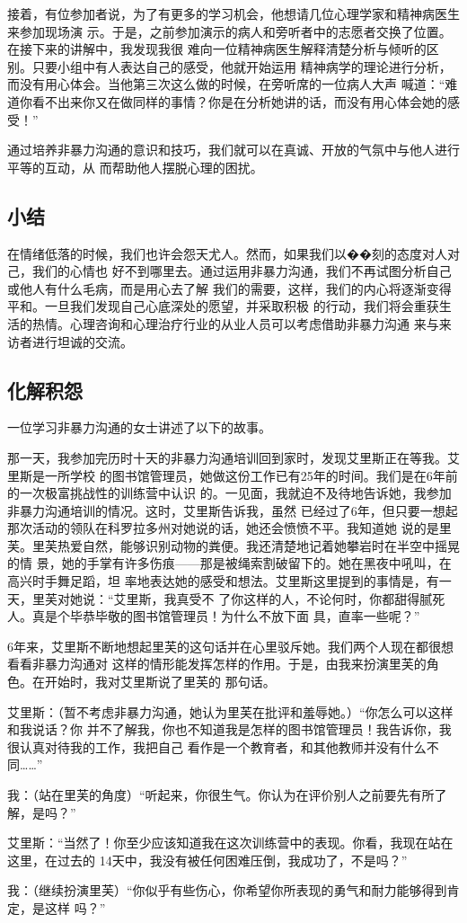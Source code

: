 \documentclass{ctexart}
\renewenvironment{quotation}{\setlength{\parskip}{0.5em}\setstretch{1.5}\kaishu\zihao{-5}\setlength{\parindent}{1em}}{\vspace{1em}}
\begin{document}
接着，有位参加者说，为了有更多的学习机会，他想请几位心理学家和精神病医生来参加现场演
示。于是，之前参加演示的病人和旁听者中的志愿者交换了位置。在接下来的讲解中，我发现我很
难向一位精神病医生解释清楚分析与倾听的区别。只要小组中有人表达自己的感受，他就开始运用
精神病学的理论进行分析，而没有用心体会。当他第三次这么做的时候，在旁听席的一位病人大声
喊道：``难道你看不出来你又在做同样的事情？你是在分析她讲的话，而没有用心体会她的感
受！''

通过培养非暴力沟通的意识和技巧，我们就可以在真诚、开放的气氛中与他人进行平等的互动，从
而帮助他人摆脱心理的困扰。


\subsection{小结}

在情绪低落的时候，我们也许会怨天尤人。然而，如果我们以��刻的态度对人对己，我们的心情也
好不到哪里去。通过运用非暴力沟通，我们不再试图分析自己或他人有什么毛病，而是用心去了解
我们的需要，这样，我们的内心将逐渐变得平和。一旦我们发现自己心底深处的愿望，并采取积极
的行动，我们将会重获生活的热情。心理咨询和心理治疗行业的从业人员可以考虑借助非暴力沟通
来与来访者进行坦诚的交流。

\subsection{化解积怨}

一位学习非暴力沟通的女士讲述了以下的故事。

那一天，我参加完历时十天的非暴力沟通培训回到家时，发现艾里斯正在等我。艾里斯是一所学校
的图书馆管理员，她做这份工作已有25年的时间。我们是在6年前的一次极富挑战性的训练营中认识
的。一见面，我就迫不及待地告诉她，我参加非暴力沟通培训的情况。这时，艾里斯告诉我，虽然
已经过了6年，但只要一想起那次活动的领队在科罗拉多州对她说的话，她还会愤愤不平。我知道她
说的是里芙。里芙热爱自然，能够识别动物的粪便。我还清楚地记着她攀岩时在半空中摇晃的情
景，她的手掌有许多伤痕------那是被绳索割破留下的。她在黑夜中吼叫，在高兴时手舞足蹈，坦
率地表达她的感受和想法。艾里斯这里提到的事情是，有一天，里芙对她说：``艾里斯，我真受不
了你这样的人，不论何时，你都甜得腻死人。真是个毕恭毕敬的图书馆管理员！为什么不放下面
具，直率一些呢？''

6年来，艾里斯不断地想起里芙的这句话并在心里驳斥她。我们两个人现在都很想看看非暴力沟通对
这样的情形能发挥怎样的作用。于是，由我来扮演里芙的角色。在开始时，我对艾里斯说了里芙的
那句话。

\begin{quotation}
	艾里斯：（暂不考虑非暴力沟通，她认为里芙在批评和羞辱她。）``你怎么可以这样和我说话？你
	并不了解我，你也不知道我是怎样的图书馆管理员！我告诉你，我很认真对待我的工作，我把自己
	看作是一个教育者，和其他教师并没有什么不同\ldots\ldots''

	我：（站在里芙的角度）``听起来，你很生气。你认为在评价别人之前要先有所了解，是吗？''

	艾里斯：``当然了！你至少应该知道我在这次训练营中的表现。你看，我现在站在这里，在过去的
	14天中，我没有被任何困难压倒，我成功了，不是吗？''

	我：（继续扮演里芙）``你似乎有些伤心，你希望你所表现的勇气和耐力能够得到肯定，是这样
	吗？''
\end{quotation}
\end{document}

